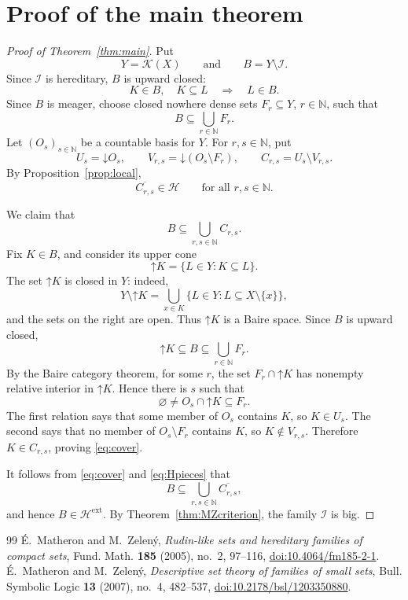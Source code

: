 \documentclass[10pt,a4paper]{amsart}
\newcommand{\K}{\mathcal K}
\newcommand{\HH}{\mathcal H}
\newcommand{\I}{\mathcal I}
\newcommand{\cl}[1]{\overline{#1}}
\newcommand{\down}[1]{\mathord{\downarrow}\!#1}
\newcommand{\up}[1]{\mathord{\uparrow}\!#1}
\begin{document}
\section{Proof of the main theorem}


\begin{proof}[Proof of Theorem~\ref{thm:main}]
Put
\[
Y=\K(X)
\qquad\text{and}\qquad
B=Y\setminus\I.
\]
Since $\I$ is hereditary, $B$ is upward closed:
\[
K\in B,\quad K\subseteq L
\quad\Longrightarrow\quad
L\in B.
\]
Since $B$ is meager, choose closed nowhere dense sets
$F_r\subseteq Y$, $r\in\mathbb N$, such that
\[
B\subseteq\bigcup_{r\in\mathbb N}F_r.
\]
Let $(O_s)_{s\in\mathbb N}$ be a countable basis for $Y$. For
$r,s\in\mathbb N$, put
\[
U_s=\down O_s,\qquad
V_{r,s}=\down(O_s\setminus F_r),\qquad
C_{r,s}=U_s\setminus V_{r,s}.
\]
By Proposition~\ref{prop:local},
\begin{equation}\label{eq:Hpieces}
\cl{C_{r,s}}\in\HH
\qquad\text{for all }r,s\in\mathbb N.
\end{equation}

We claim that
\begin{equation}\label{eq:cover}
B\subseteq\bigcup_{r,s\in\mathbb N}C_{r,s}.
\end{equation}
Fix $K\in B$, and consider its upper cone
\[
\up K=\{L\in Y:K\subseteq L\}.
\]
The set $\up K$ is closed in $Y$: indeed,
\[
Y\setminus\up K
=
\bigcup_{x\in K}
\{L\in Y:L\subseteq X\setminus\{x\}\},
\]
and the sets on the right are open. Thus $\up K$ is a Baire space.
Since $B$ is upward closed,
\[
\up K\subseteq B\subseteq\bigcup_{r\in\mathbb N}F_r.
\]
By the Baire category theorem, for some $r$, the set
$F_r\cap\up K$ has nonempty relative interior in $\up K$. Hence there
is $s$ such that
\[
\varnothing\neq O_s\cap\up K\subseteq F_r.
\]
The first relation says that some member of $O_s$ contains $K$, so
$K\in U_s$. The second says that no member of
$O_s\setminus F_r$ contains $K$, so $K\notin V_{r,s}$. Therefore
$K\in C_{r,s}$, proving \eqref{eq:cover}.

It follows from \eqref{eq:cover} and \eqref{eq:Hpieces} that
\[
B\subseteq
\bigcup_{r,s\in\mathbb N}\cl{C_{r,s}},
\]
and hence $B\in\HH^{\mathrm{ext}}$. By
Theorem~\ref{thm:MZcriterion}, the family $\I$ is big.
\end{proof}


\begin{thebibliography}{99}
 É.~Matheron and M.~Zelený, \emph{Rudin-like sets and hereditary families of compact sets}, Fund. Math. \textbf{185} (2005), no.~2, 97--116, \href{https://doi.org/10.4064/fm185-2-1}{doi:10.4064/fm185-2-1}.
 É.~Matheron and M.~Zelený, \emph{Descriptive set theory of families of small sets}, Bull. Symbolic Logic \textbf{13} (2007), no.~4, 482--537, \href{https://doi.org/10.2178/bsl/1203350880}{doi:10.2178/bsl/1203350880}.
\end{thebibliography}
\end{document}
